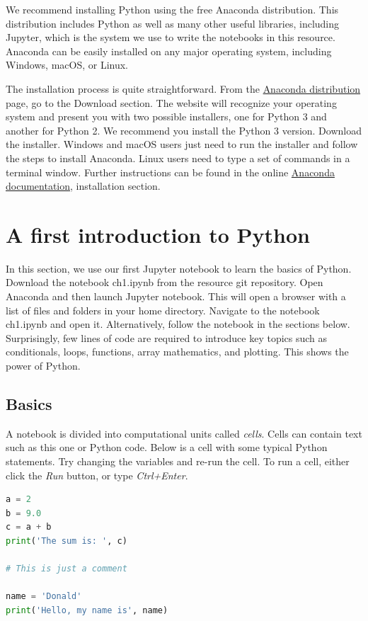 \documentclass[a4paper , 12pt]{book}
\begin{document}
We recommend installing Python using the free Anaconda distribution. This distribution includes Python as well as many other useful libraries, including Jupyter, which is the system we use to write the notebooks in this resource. Anaconda can be easily installed on any major operating system, including Windows, macOS, or Linux.

The installation process is quite straightforward. From the \href {https://www.anaconda.com/distribution/}{Anaconda distribution} page, go to the Download section. The website will recognize your operating system and present you with two possible installers, one for Python 3 and another for Python 2. We recommend you install the Python 3 version. Download the installer. Windows and macOS users just need to run the installer and follow the steps to install Anaconda. Linux users need to type a set of commands in a terminal window. Further instructions can be found in the online \href {https://docs.anaconda.com/anaconda/} {Anaconda documentation}, installation section.

\section{A first introduction to Python}

In this section, we use our first Jupyter notebook to learn the basics of Python. Download the notebook ch1.ipynb from the resource git repository. Open Anaconda and then launch Jupyter notebook. This will open a browser with a list of files and folders in your home directory. Navigate to the notebook ch1.ipynb and open it. Alternatively, follow the notebook in the sections below. Surprisingly, few lines of code are required to introduce key topics such as conditionals, loops, functions, array mathematics, and plotting. This shows the power of Python.

\subsection{Basics}

A notebook is divided into computational units called \textit{cells}. Cells can contain text such as this one or Python code. Below is a cell with some typical Python statements. Try changing the variables and re-run the cell. To run a cell, either click the \textit{Run} button, or type \textit{Ctrl+Enter}.

\begin{center}
\begin{lstlisting}[language=Python, frame=single]
a = 2 
b = 9.0 
c = a + b 
print('The sum is: ', c) 
 	
# This is just a comment 
	
name = 'Donald' 
print('Hello, my name is', name)
\end{lstlisting}
\end{center}
\end{document}
